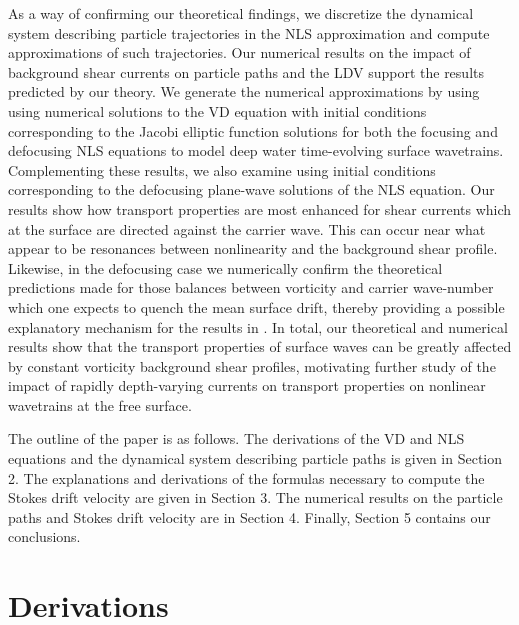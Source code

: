 \documentclass{JFM_Style/jfm}
\begin{document}
As a way of confirming our theoretical findings, we discretize the dynamical system describing particle trajectories in the NLS approximation and compute approximations of such trajectories. Our numerical results on the impact of background shear currents on particle paths and the LDV support the results predicted by our theory. We generate the numerical approximations by using using numerical solutions to the VD equation with initial conditions corresponding to the Jacobi elliptic function solutions for both the focusing and defocusing NLS equations to model deep water time-evolving surface wavetrains.  Complementing these results, we also examine using initial conditions corresponding to the defocusing plane-wave solutions of the NLS equation.  Our results show how transport properties are most enhanced for shear currents which at the surface are directed against the carrier wave.  This can occur near what appear to be resonances between nonlinearity and the background shear profile.  Likewise, in the defocusing case we numerically confirm the theoretical predictions made for those balances between vorticity and carrier wave-number which one expects to quench the mean surface drift, thereby providing a possible explanatory mechanism for the results in \cite{smith,breivik,monismith}.  In total, our theoretical and numerical results show that the transport properties of surface waves can be greatly affected by constant vorticity background shear profiles, motivating further study of the impact of rapidly depth-varying currents on transport properties on nonlinear wavetrains at the free surface.

The outline of the paper is as follows.  The derivations of the VD and NLS equations and the dynamical system describing particle paths is given in Section 2.  The explanations and derivations of the formulas necessary to compute the Stokes drift velocity are given in Section 3.  The numerical results on the particle paths and Stokes drift velocity are in Section 4.  Finally, Section 5 contains our conclusions.
\section{Derivations}
\end{document}
